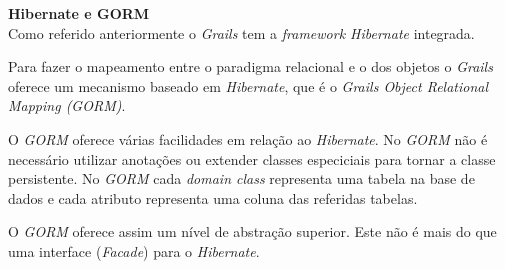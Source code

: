 \pagebreak

\textbf{\large{Hibernate e GORM}}\\

  Como referido anteriormente o \textit{Grails} tem a \textit{framework Hibernate} integrada.

  Para fazer o mapeamento entre o paradigma relacional e o dos objetos o \textit{Grails} oferece um mecanismo baseado em \textit{Hibernate}, que é o \textit{Grails Object Relational Mapping (GORM)}.

  O \textit{GORM} oferece várias facilidades em relação ao \textit{Hibernate}. No \textit{GORM} não é necessário utilizar anotações ou extender classes especiciais para tornar a classe persistente. No \textit{GORM} cada \textit{domain class} representa uma tabela na base de dados e cada atributo representa uma coluna das referidas tabelas.

  O \textit{GORM} oferece assim um nível de abstração superior. Este não é mais do que uma interface (\textit{Facade}) para o \textit{Hibernate}.

